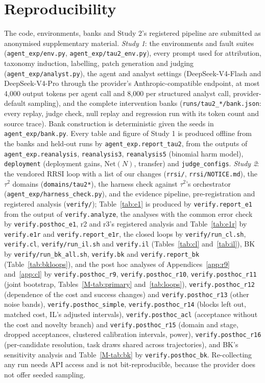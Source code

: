 \documentclass[11pt]{article}
\begin{document}
\section{Reproducibility}
\label{app:repro}
The code, environments, banks and Study 2's registered pipeline are submitted as anonymised supplementary material. \emph{Study 1}: the environments and fault suites (\texttt{agent\_exp/env.py}, \texttt{agent\_exp/tau2\_env.py}), every prompt used for attribution, taxonomy induction, labelling, patch generation and judging (\texttt{agent\_exp/analyst.py}), the agent and analyst settings (DeepSeek-V4-Flash and DeepSeek-V4-Pro through the provider's Anthropic-compatible endpoint, at most 4{,}000 output tokens per agent call and 8{,}000 per structured analyst call, provider-default sampling), and the complete intervention banks (\texttt{runs/tau2\_*/bank.json}: every replay, judge check, null replay and regression run with its token count and source trace). Bank construction is deterministic given the seeds in \texttt{agent\_exp/bank.py}. Every table and figure of Study 1 is produced offline from the banks and held-out runs by \texttt{agent\_exp.report\_tau2}, from the outputs of \texttt{agent\_exp.reanalysis}, \texttt{reanalysis3}, \texttt{reanalysis5} (binomial harm model), \texttt{deployment} (deployment gains, $\mathrm{Net}(N)$, transfer) and \texttt{judge\_configs}. \emph{Study 2}: the vendored RRSI loop with a list of our changes (\texttt{rrsi/}, \texttt{rrsi/NOTICE.md}), the $\tau^2$ domains (\texttt{domains/tau2*}), the harness check against $\tau^2$'s orchestrator (\texttt{agent\_exp/harness\_check.py}), and the evidence pipeline, pre-registration and registered analysis (\texttt{verify/}); Table~\ref{tab:e1} is produced by \texttt{verify.report\_e1} from the output of \texttt{verify.analyze}, the analyses with the common error check by \texttt{verify.posthoc\_e1}, r2 and r3's registered analysis and Table~\ref{tab:e1r} by \texttt{verify.e1r} and \texttt{verify.report\_e1r}, the closed loops by \texttt{verify/run\_cl.sh}, \texttt{verify.cl}, \texttt{verify/run\_il.sh} and \texttt{verify.il} (Tables~\ref{tab:cl} and~\ref{tab:il}), BK by \texttt{verify/run\_bk\_all.sh}, \texttt{verify.bk} and \texttt{verify.report\_bk} (Table~\ref{tab:bkloops}), and the post hoc analyses of Appendices~\ref{app:r9} and~\ref{app:cl} by \texttt{verify.posthoc\_r9}, \texttt{verify.posthoc\_r10}, \texttt{verify.posthoc\_r11} (joint bootstrap, Tables~\ref*{M-tab:primary} and~\ref{tab:loops}), \texttt{verify.posthoc\_r12} (dependence of the cost and success changes) and \texttt{verify.posthoc\_r13} (other noise bands), \texttt{verify.posthoc\_simple}, \texttt{verify.posthoc\_r14} (blocks left out, matched cost, IL's adjusted intervals), \texttt{verify.posthoc\_acl} (acceptance without the cost and novelty branch) and \texttt{verify.posthoc\_r15} (domain and stage, dropped acceptances, clustered calibration intervals, power), \texttt{verify.posthoc\_r16} (per-candidate resolution, task draws shared across trajectories), and BK's sensitivity analysis and Table~\ref*{M-tab:bk} by \texttt{verify.posthoc\_bk}. Re-collecting any run needs API access and is not bit-reproducible, because the provider does not offer seeded sampling.
\end{document}
